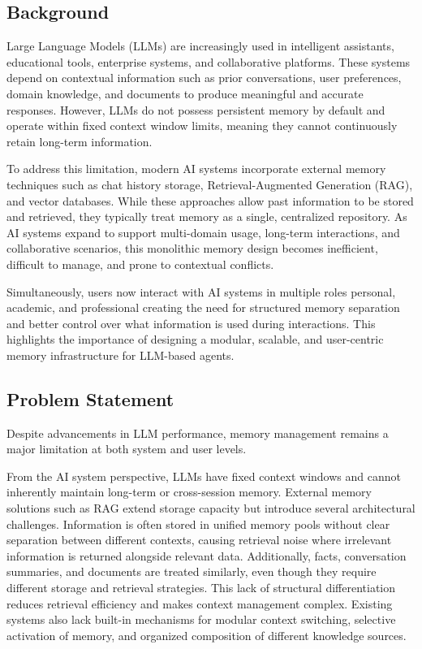 ﻿\documentclass[12pt,a4paper]{article}
\begin{document}
\subsection{Background}

Large Language Models (LLMs) are increasingly used in intelligent assistants, educational tools, enterprise systems, and collaborative platforms. These systems depend on contextual information such as prior conversations, user preferences, domain knowledge, and documents to produce meaningful and accurate responses. However, LLMs do not possess persistent memory by default and operate within fixed context window limits, meaning they cannot continuously retain long-term information.

To address this limitation, modern AI systems incorporate external memory techniques such as chat history storage, Retrieval-Augmented Generation (RAG), and vector databases. While these approaches allow past information to be stored and retrieved, they typically treat memory as a single, centralized repository. As AI systems expand to support multi-domain usage, long-term interactions, and collaborative scenarios, this monolithic memory design becomes inefficient, difficult to manage, and prone to contextual conflicts.

Simultaneously, users now interact with AI systems in multiple roles  personal, academic, and professional creating the need for structured memory separation and better control over what information is used during interactions. This highlights the importance of designing a modular, scalable, and user-centric memory infrastructure for LLM-based agents.

\subsection{Problem Statement}

Despite advancements in LLM performance, memory management remains a major limitation at both system and user levels.

From the AI system perspective, LLMs have fixed context windows and cannot inherently maintain long-term or cross-session memory. External memory solutions such as RAG extend storage capacity but introduce several architectural challenges. Information is often stored in unified memory pools without clear separation between different contexts, causing retrieval noise where irrelevant information is returned alongside relevant data. Additionally, facts, conversation summaries, and documents are treated similarly, even though they require different storage and retrieval strategies. This lack of structural differentiation reduces retrieval efficiency and makes context management complex. Existing systems also lack built-in mechanisms for modular context switching, selective activation of memory, and organized composition of different knowledge sources.
\end{document}
